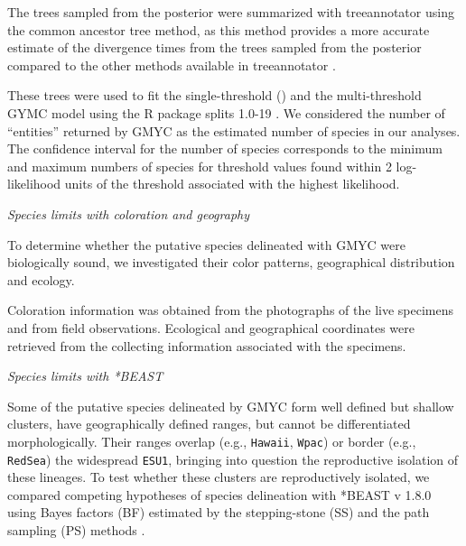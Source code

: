 \documentclass[12pt,letterpaper]{article}\usepackage[]{graphicx}\usepackage[]{color}
\renewcommand{\subsection}[1]{%
\bigskip
\begin{center}
\begin{large}
\normalfont\itshape #1
\end{large}
\end{center}}
\begin{document}
The trees sampled from the posterior were summarized with treeannotator using
the common ancestor tree method, as this method provides a more accurate
estimate of the divergence times from the trees sampled from the posterior
compared to the other methods available in treeannotator \citep{Heled2013}.

These trees were used to fit the single-threshold (\citep{Pons2006}) and the
multi-threshold \citep{Monaghan2009} GYMC model using the R package splits 1.0-19
\citep{Ezard2013}. We considered the number of ``entities'' returned by GMYC as
the estimated number of species in our analyses. The confidence interval for the
number of species corresponds to the minimum and maximum numbers of species for
threshold values found within 2 log-likelihood units of the threshold associated
with the highest likelihood.

\subsection{Species limits with coloration and geography}

To determine whether the putative species delineated with GMYC were biologically
sound, we investigated their color patterns, geographical distribution and ecology.

Coloration information was obtained from the photographs of the live specimens
and from field observations. Ecological and geographical coordinates were
retrieved from the collecting information associated with the specimens.




\subsection{Species limits with *BEAST}

Some of the putative species delineated by GMYC form well defined but shallow
clusters, have geographically defined ranges, but cannot be differentiated
morphologically. Their ranges overlap (e.g., \texttt{Hawaii}, \texttt{Wpac}) or
border (e.g., \texttt{RedSea}) the widespread \texttt{ESU1}, bringing into
question the reproductive isolation of these lineages. To test whether these
clusters are reproductively isolated, we compared competing hypotheses of
species delineation with *BEAST v 1.8.0 \citep{Heled2010} using Bayes factors
(BF) estimated by the stepping-stone (SS) and the path sampling (PS) methods
\citep{Baele2012}.
\end{document}
